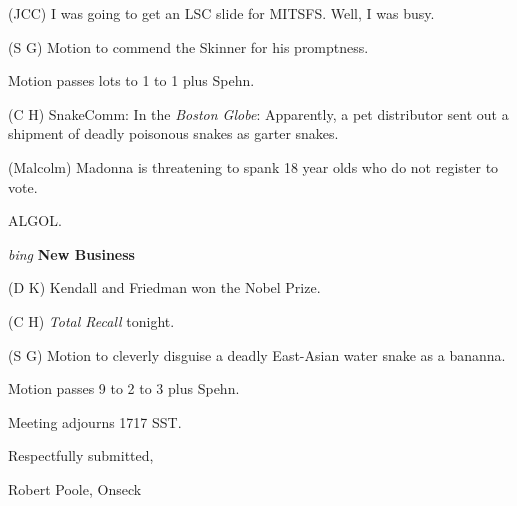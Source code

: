 (JCC) I was going to get an LSC slide for MITSFS.  Well, I was busy.

(S G) Motion to commend the Skinner for his promptness.

Motion passes lots to 1 to 1 plus Spehn.

(C H) SnakeComm: In the {\em Boston Globe\/}: Apparently, a pet distributor
sent out a shipment of deadly poisonous snakes as garter snakes.

(Malcolm) Madonna is threatening to spank 18 year olds who do not register to
vote.

ALGOL.

\vspace{0.15in}
{\em bing\/} {\bf New Business\/}

(D K) Kendall and Friedman won the Nobel Prize.

(C H) {\em Total Recall\/} tonight.

(S G) Motion to cleverly disguise a deadly East-Asian water snake as a
bananna.

Motion passes 9 to 2 to 3 plus Spehn.

Meeting adjourns 1717 SST.

\vspace{0.15in}
\begin{center}
Respectfully submitted,

Robert Poole, Onseck
\end{center}

